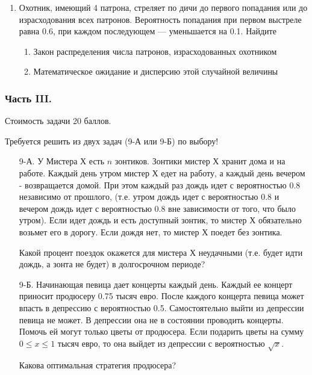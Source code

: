 \begin{enumerate}
\item Охотник, имеющий 4 патрона, стреляет по дичи до первого
попадания или до израсходования всех патронов. Вероятность
попадания при первом выстреле равна 0.6, при каждом последующем —
уменьшается на 0.1. Найдите
\begin{enumerate}
\item Закон распределения числа патронов, израсходованных охотником
\item Математическое ожидание и дисперсию этой случайной величины
\end{enumerate}
\end{enumerate}

\subsubsection*{Часть III.}

Стоимость задачи 20 баллов.

Требуется решить \textbf{} из двух задач (9-А или 9-Б) по
выбору!

\begin{enumerate}
\item[9-А.] У Мистера Х есть $n$ зонтиков. Зонтики мистер Х хранит дома и на работе. Каждый день утром мистер Х едет на работу, а каждый день вечером - возвращается домой. При этом каждый раз дождь идет с вероятностью 0.8 независимо от прошлого, (т.е. утром дождь идет с вероятностью 0.8 и вечером дождь идет с вероятностью 0.8 вне зависимости от того, что было утром). Если идет дождь и есть доступный зонтик, то мистер Х обязательно возьмет его в дорогу. Если дождя нет, то мистер Х поедет без зонтика.

Какой процент поездок окажется для мистера Х неудачными (т.е. будет идти дождь, а зонта не будет) в долгосрочном периоде?

\item[9-Б.] Начинающая певица дает концерты каждый день. Каждый ее концерт приносит продюсеру 0.75 тысяч евро. После каждого концерта певица может впасть в депрессию с вероятностью 0.5. Самостоятельно выйти из депрессии певица не может. В депрессии она не в состоянии проводить концерты. Помочь ей могут только цветы от продюсера. Если подарить цветы на сумму $0\le x\le 1$ тысяч евро, то она выйдет из депрессии с вероятностью $\sqrt{x}$.

Какова оптимальная стратегия продюсера?
\end{enumerate}

